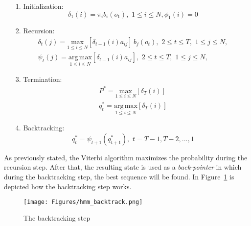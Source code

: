 \begin{itemize}
	\item[1.]{Initialization:} \\
	\begin{equation}
		\delta_{1}(i) = \pi_{i}b_{i}(o_{1}), \,\, 1 \leq i \leq N, \phi_{1}(i) = 0
	\end{equation}

	\item[2.]{Recursion:} \\
	\begin{subequations}
		\begin{align}
		\delta_{t}(j) = \underset{1\leq i \leq N}{\mathrm{max}} [\delta_{t-1}(i)a_{ij}] \, b_{j}(o_{t}), \,\, 2 \leq t \leq T, \,\, 1 \leq j \leq N, \\
		\psi_{t}(j) = \underset{1\leq i \leq N}{\mathrm{arg \, max}} [\delta_{t-1}(i)a_{ij}], \,\, 2 \leq t \leq T, \,\, 1 \leq j \leq N,
		\end{align}
	\end{subequations}

	\item[3.]{Termination:} \\
	\begin{subequations}
		\begin{align}
		P^{*} = \underset{1\leq i \leq N}{\mathrm{max}}[\delta_{T}(i)] \\
		q_{t}^{*} = \underset{1\leq i \leq N}{\mathrm{arg \, max}}[\delta_{T}(i)]
		\end{align}
	\end{subequations}

	\item[4.]{Backtracking:} \\
	\begin{equation}
		q_{t}^{*} = \psi_{t+1}(q_{t+1}^{*}), \,\, t = T - 1, T - 2, ... , 1
	\end{equation}
\end{itemize}

\noindent As previously stated, the Viterbi algorithm maximizes the probability during the recursion step. After that, the resulting state is used as a \textit{back-pointer} in which during the backtracking step, the best sequence will be found. In Figure~\ref{fig:hmm_backtrack} is depicted how the backtracking step works.

\begin{figure}[!ht]
	\centering
	\texttt{[image: Figures/hmm\_backtrack.png]}
	\caption{The backtracking step}
	\label{fig:hmm_backtrack}
\end{figure}


